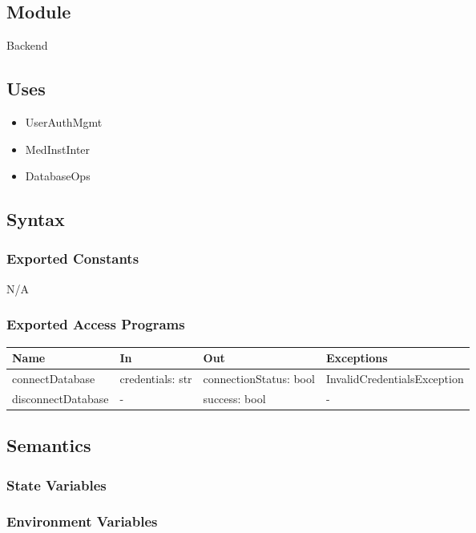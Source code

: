 \documentclass[12pt, titlepage]{article}
\begin{document}
\subsection{Module}
Backend
\subsection{Uses}
\begin{itemize}
    \item UserAuthMgmt
    \item MedInstInter
    \item DatabaseOps
\end{itemize}
\subsection{Syntax}

\subsubsection{Exported Constants}
N/A
\subsubsection{Exported Access Programs}

\begin{center}
\begin{tabular}{p{3cm} p{4cm} p{4cm} p{5cm}}
\hline
\textbf{Name} & \textbf{In} & \textbf{Out} & \textbf{Exceptions} \\
\hline
connectDatabase & credentials: str & connectionStatus: bool & InvalidCredentialsException \\
disconnectDatabase & - & success: bool & - \\
\hline
\end{tabular}
\end{center}

\subsection{Semantics}

\subsubsection{State Variables}

\subsubsection{Environment Variables}
\end{document}
